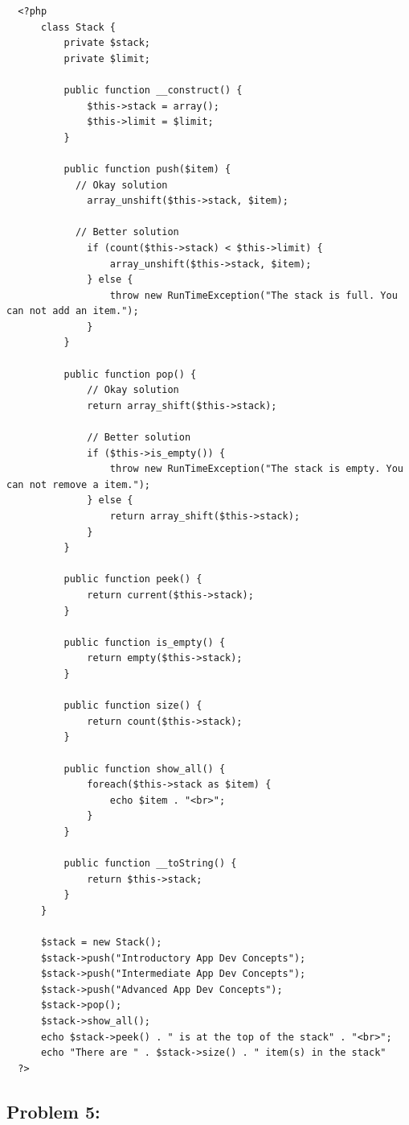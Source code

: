 \documentclass{article}
\begin{document}
\begin{verbatim}
  <?php
      class Stack {
          private $stack;
          private $limit;

          public function __construct() {
              $this->stack = array();
              $this->limit = $limit;
          }

          public function push($item) {
            // Okay solution
              array_unshift($this->stack, $item); 

            // Better solution
              if (count($this->stack) < $this->limit) {
                  array_unshift($this->stack, $item);
              } else {
                  throw new RunTimeException("The stack is full. You can not add an item.");
              }
          }

          public function pop() {
              // Okay solution
              return array_shift($this->stack);

              // Better solution
              if ($this->is_empty()) {
                  throw new RunTimeException("The stack is empty. You can not remove a item.");
              } else {
                  return array_shift($this->stack); 
              }
          }

          public function peek() {
              return current($this->stack);
          }

          public function is_empty() {
              return empty($this->stack);
          }

          public function size() {
              return count($this->stack);
          }

          public function show_all() {
              foreach($this->stack as $item) {
                  echo $item . "<br>";
              }
          }

          public function __toString() {
              return $this->stack;
          }
      }   
          
      $stack = new Stack();
      $stack->push("Introductory App Dev Concepts");
      $stack->push("Intermediate App Dev Concepts");
      $stack->push("Advanced App Dev Concepts");
      $stack->pop();
      $stack->show_all();
      echo $stack->peek() . " is at the top of the stack" . "<br>";
      echo "There are " . $stack->size() . " item(s) in the stack"
  ?>
\end{verbatim}

\subsection*{Problem 5:} 
\end{document}
